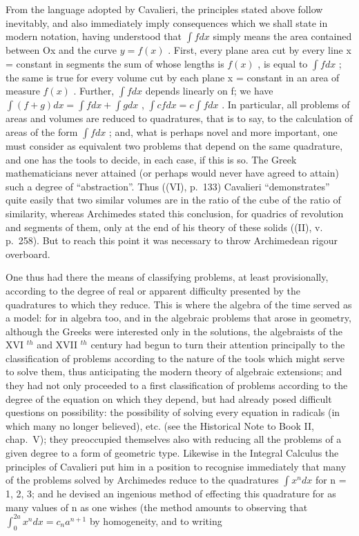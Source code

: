 From the language adopted by Cavalieri, the principles stated above follow inevitably, and also immediately imply consequences which we shall state in modern notation, having understood that \(\int f dx\) simply means the area contained between Ox and the curve \(y = f(x)\) . First, every plane area cut by every line x = constant in segments the sum of whose lengths is \(f(x)\) , is equal to \(\int f dx\) ; the same is true for every volume cut by each plane x = constant in an area of measure \(f(x)\) . Further, \(\int f dx\) depends linearly on f; we have \(\int (f + g) dx = \int f dx + \int g dx\) , \(\int cf dx = c \int f dx\) . In particular, all problems of areas and volumes are reduced to quadratures, that is to say, to the calculation of areas of the form \(\int f dx\) ; and, what is perhaps novel and more important, one must consider as equivalent two problems that depend on the same quadrature, and one has the tools to decide, in each case, if this is so. The Greek mathematicians never attained (or perhaps would never have agreed to attain) such a degree of ``abstraction''. Thus ((VI), p.~133) Cavalieri ``demonstrates'' quite easily that two similar volumes are in the ratio of the cube of the ratio of similarity, whereas Archimedes stated this conclusion, for quadrics of revolution and segments of them, only at the end of his theory of these solids ((II), v. p.~258). But to reach this point it was necessary to throw Archimedean rigour overboard.

One thus had there the means of classifying problems, at least provisionally, according to the degree of real or apparent difficulty presented by the quadratures to which they reduce. This is where the algebra of the time served as a model: for in algebra too, and in the algebraic problems that arose in geometry, although the Greeks were interested only in the solutions, the algebraists of the XVI \(^{th}\) and XVII \(^{th}\) century had begun to turn their attention principally to the classification of problems according to the nature of the tools which might serve to solve them, thus anticipating the modern theory of algebraic extensions; and they had not only proceeded to a first classification of problems according to the degree of the equation on which they depend, but had already posed difficult questions on possibility: the possibility of solving every equation in radicals (in which many no longer believed), etc. (see the Historical Note to Book II, chap.~V); they preoccupied themselves also with reducing all the problems of a given degree to a form of geometric type. Likewise in the Integral Calculus the principles of Cavalieri put him in a position to recognise immediately that many of the problems solved by Archimedes reduce to the quadratures \(\int x^{n} dx\) for n = 1, 2, 3; and he devised an ingenious method of effecting this quadrature for as many values of n as one wishes (the method amounts to observing that \(\int_{0}^{2a} x^{n} dx = c_{n} a^{n+1}\) by homogeneity, and to writing

